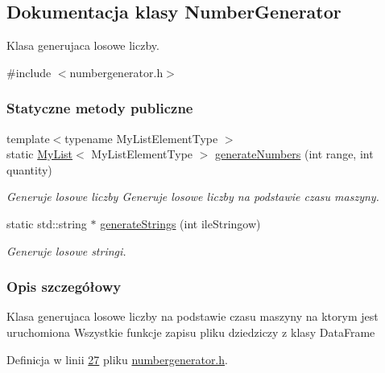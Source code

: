 \hypertarget{class_number_generator}{\subsection{Dokumentacja klasy Number\-Generator}
\label{class_number_generator}
}


Klasa generujaca losowe liczby.  




{\ttfamily \#include $<$numbergenerator.\-h$>$}

\subsubsection*{Statyczne metody publiczne}
\begin{DoxyCompactItemize}
\item 
{\footnotesize template$<$typename My\-List\-Element\-Type $>$ }\\static \hyperlink{class_my_list}{My\-List}$<$ My\-List\-Element\-Type $>$ \hyperlink{class_number_generator_ab3c0d704683453456684ec24fb771334}{generate\-Numbers} (int range, int quantity)
\begin{DoxyCompactList}\small\item\em Generuje losowe liczby Generuje losowe liczby na podstawie czasu maszyny. \end{DoxyCompactList}\item 
static std\-::string $\ast$ \hyperlink{class_number_generator_afed5ae8efb72655770753790714b7643}{generate\-Strings} (int ile\-Stringow)
\begin{DoxyCompactList}\small\item\em Generuje losowe stringi. \end{DoxyCompactList}\end{DoxyCompactItemize}


\subsubsection{Opis szczegółowy}
Klasa generujaca losowe liczby na podstawie czasu maszyny na ktorym jest uruchomiona Wszystkie funkcje zapisu pliku dziedziczy z klasy Data\-Frame 

Definicja w linii \hyperlink{numbergenerator_8h_source_l00027}{27} pliku \hyperlink{numbergenerator_8h_source}{numbergenerator.\-h}.



